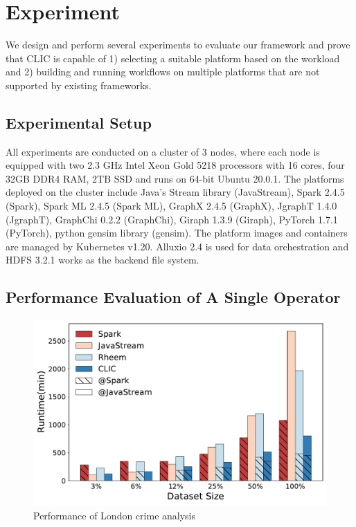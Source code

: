 
\section{Experiment}
We design and perform several experiments to evaluate our framework and prove that CLIC is capable of 1) selecting a suitable platform based on the workload and 2) building and running workflows on multiple platforms that are not supported by existing frameworks. 

\subsection{Experimental Setup}
All experiments are conducted on a cluster of 3 nodes, where each node is equipped with two 2.3 GHz Intel Xeon Gold 5218 processors with 16 cores, four 32GB DDR4 RAM, 2TB SSD and runs on 64-bit Ubuntu 20.0.1. The platforms deployed on the cluster include Java’s Stream library (JavaStream), Spark 2.4.5 (Spark), Spark ML 2.4.5 (Spark ML), GraphX 2.4.5 (GraphX), JgraphT 1.4.0 (JgraphT), GraphChi 0.2.2 (GraphChi), Giraph 1.3.9 (Giraph), PyTorch 1.7.1 (PyTorch), python gensim library (gensim). The platform images and containers are managed by Kubernetes v1.20. Alluxio 2.4 is used for data orchestration and HDFS 3.2.1 works as the backend file system.


\subsection{Performance Evaluation of A Single Operator}
\begin{figure}
  \centering
  \includegraphics[width=0.7\linewidth]{figures/chp6-CrimeStage.pdf}
  \caption{Performance of London crime analysis}
  \label{fig:exp-crime}
\end{figure}

